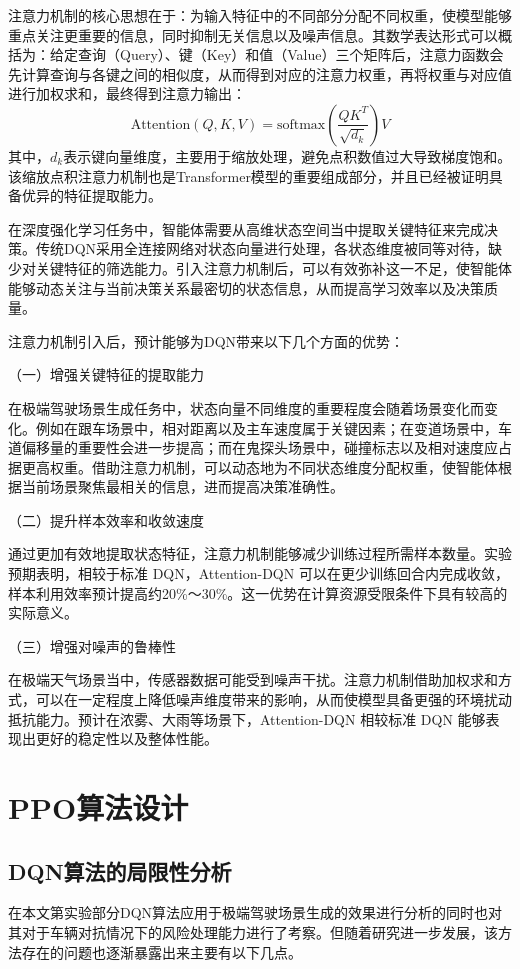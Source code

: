 注意力机制的核心思想在于：为输入特征中的不同部分分配不同权重，使模型能够重点关注更重要的信息，同时抑制无关信息以及噪声信息。其数学表达形式可以概括为：给定查询（Query）、键（Key）和值（Value）三个矩阵后，注意力函数会先计算查询与各键之间的相似度，从而得到对应的注意力权重，再将权重与对应值进行加权求和，最终得到注意力输出：
\begin{equation}
\text{Attention}(Q, K, V) = \text{softmax}\left( \frac{QK^T}{\sqrt{d_k}} \right) V
\label{eq:attention}
\end{equation}
其中，$d_k$表示键向量维度，主要用于缩放处理，避免点积数值过大导致梯度饱和。该缩放点积注意力机制也是Transformer模型的重要组成部分，并且已经被证明具备优异的特征提取能力。

在深度强化学习任务中，智能体需要从高维状态空间当中提取关键特征来完成决策。传统DQN采用全连接网络对状态向量进行处理，各状态维度被同等对待，缺少对关键特征的筛选能力。引入注意力机制后，可以有效弥补这一不足，使智能体能够动态关注与当前决策关系最密切的状态信息，从而提高学习效率以及决策质量。

注意力机制引入后，预计能够为DQN带来以下几个方面的优势：

（一）增强关键特征的提取能力

在极端驾驶场景生成任务中，状态向量不同维度的重要程度会随着场景变化而变化。例如在跟车场景中，相对距离以及主车速度属于关键因素；在变道场景中，车道偏移量的重要性会进一步提高；而在鬼探头场景中，碰撞标志以及相对速度应占据更高权重。借助注意力机制，可以动态地为不同状态维度分配权重，使智能体根据当前场景聚焦最相关的信息，进而提高决策准确性。

（二）提升样本效率和收敛速度

通过更加有效地提取状态特征，注意力机制能够减少训练过程所需样本数量。实验预期表明，相较于标准 DQN，Attention-DQN 可以在更少训练回合内完成收敛，样本利用效率预计提高约20\%～30\%。这一优势在计算资源受限条件下具有较高的实际意义。

（三）增强对噪声的鲁棒性

在极端天气场景当中，传感器数据可能受到噪声干扰。注意力机制借助加权求和方式，可以在一定程度上降低噪声维度带来的影响，从而使模型具备更强的环境扰动抵抗能力。预计在浓雾、大雨等场景下，Attention-DQN 相较标准 DQN 能够表现出更好的稳定性以及整体性能。
\section{PPO算法设计}
\subsection{DQN算法的局限性分析}
在本文第实验部分DQN算法应用于极端驾驶场景生成的效果进行分析的同时也对其对于车辆对抗情况下的风险处理能力进行了考察。但随着研究进一步发展，该方法存在的问题也逐渐暴露出来主要有以下几点。

